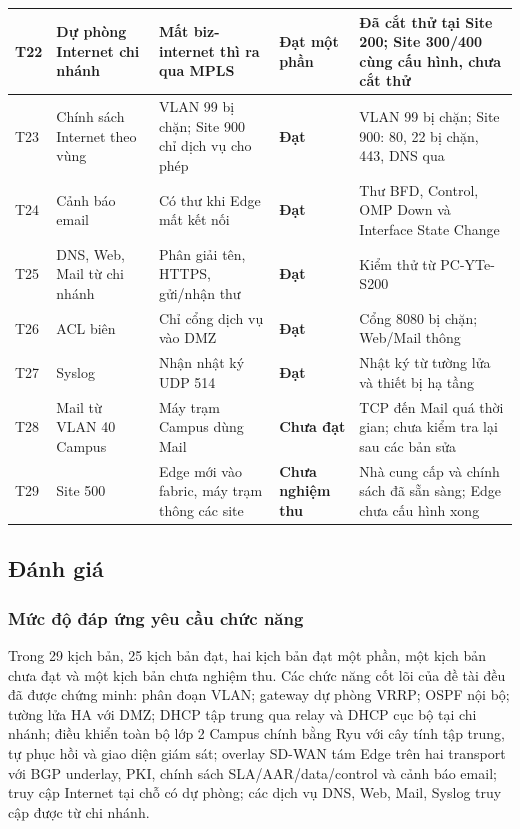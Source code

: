 \begin{longtable}{|P{0.7cm}|P{2.8cm}|P{3.4cm}|P{1.8cm}|P{4.0cm}|}
    \hline
    T22 & Dự phòng Internet chi nhánh & Mất biz-internet thì ra qua MPLS & \textbf{Đạt một phần} & Đã cắt thử tại Site 200; Site 300/400 cùng cấu hình, chưa cắt thử \\
    \hline
    T23 & Chính sách Internet theo vùng & VLAN 99 bị chặn; Site 900 chỉ dịch vụ cho phép & \textbf{Đạt} & VLAN 99 bị chặn; Site 900: 80, 22 bị chặn, 443, DNS qua \\
    \hline
    T24 & Cảnh báo email & Có thư khi Edge mất kết nối & \textbf{Đạt} & Thư BFD, Control, OMP Down và Interface State Change \\
    \hline
    T25 & DNS, Web, Mail từ chi nhánh & Phân giải tên, HTTPS, gửi/nhận thư & \textbf{Đạt} & Kiểm thử từ PC-YTe-S200 \\
    \hline
    T26 & ACL biên & Chỉ cổng dịch vụ vào DMZ & \textbf{Đạt} & Cổng 8080 bị chặn; Web/Mail thông \\
    \hline
    T27 & Syslog & Nhận nhật ký UDP 514 & \textbf{Đạt} & Nhật ký từ tường lửa và thiết bị hạ tầng \\
    \hline
    T28 & Mail từ VLAN 40 Campus & Máy trạm Campus dùng Mail & \textbf{Chưa đạt} & TCP đến Mail quá thời gian; chưa kiểm tra lại sau các bản sửa \\
    \hline
    T29 & Site 500 & Edge mới vào fabric, máy trạm thông các site & \textbf{Chưa nghiệm thu} & Nhà cung cấp và chính sách đã sẵn sàng; Edge chưa cấu hình xong \\
\end{longtable}
\endgroup

\subsection{Đánh giá}

\subsubsection{Mức độ đáp ứng yêu cầu chức năng}

Trong 29 kịch bản, 25 kịch bản đạt, hai kịch bản đạt một phần, một kịch bản chưa đạt và một kịch bản chưa nghiệm thu. Các chức năng cốt lõi của đề tài đều đã được chứng minh: phân đoạn VLAN; gateway dự phòng VRRP; OSPF nội bộ; tường lửa HA với DMZ; DHCP tập trung qua relay và DHCP cục bộ tại chi nhánh; điều khiển toàn bộ lớp 2 Campus chính bằng Ryu với cây tính tập trung, tự phục hồi và giao diện giám sát; overlay SD-WAN tám Edge trên hai transport với BGP underlay, PKI, chính sách SLA/AAR/data/control và cảnh báo email; truy cập Internet tại chỗ có dự phòng; các dịch vụ DNS, Web, Mail, Syslog truy cập được từ chi nhánh.

